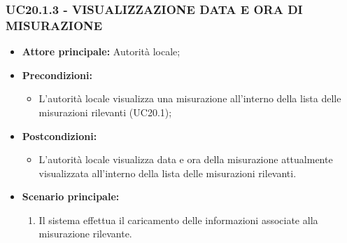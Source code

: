 \subsubsection{UC20.1.3 - VISUALIZZAZIONE DATA E ORA DI MISURAZIONE}
\begin{itemize}
    \item \textbf{Attore principale:} Autorità locale;
    \item \textbf{Precondizioni:}
        \begin{itemize}
                \item L'autorità locale visualizza una misurazione all'interno della lista delle misurazioni rilevanti (UC20.1);
        \end{itemize}
    \vspace{0,5cm}
    \item \textbf{Postcondizioni:}
        \begin{itemize}
            \item L'autorità locale visualizza data e ora della misurazione attualmente visualizzata all'interno della lista delle misurazioni rilevanti.
        \end{itemize}
    \item \textbf{Scenario principale:}
        \begin{enumerate}
            \item Il sistema effettua il caricamento delle informazioni associate alla misurazione rilevante.
        \end{enumerate}
\end{itemize}